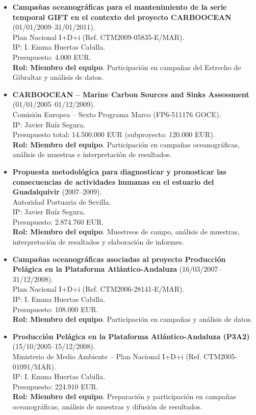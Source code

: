 \documentclass[11pt,a4paper]{article}
\begin{document}
\begin{itemize}[leftmargin=*]
    \item \textbf{Campañas oceanográficas para el mantenimiento de la serie temporal GIFT en el contexto del proyecto CARBOOCEAN} (01/01/2009--31/01/2011).\\
    Plan Nacional I+D+i (Ref. CTM2009-05835-E/MAR).\\
    IP: I. Emma Huertas Cabilla.\\
    Presupuesto: 4.000 EUR.\\
    \textbf{Rol: Miembro del equipo}. Participación en campañas del Estrecho de Gibraltar y análisis de datos.

    \item \textbf{CARBOOCEAN – Marine Carbon Sources and Sinks Assessment} (01/01/2005--01/12/2009).\\
    Comisión Europea – Sexto Programa Marco (FP6-511176 GOCE).\\
    IP: Javier Ruíz Segura.\\
    Presupuesto total: 14.500.000 EUR (subproyecto: 120.000 EUR).\\
    \textbf{Rol: Miembro del equipo}. Participación en campañas oceanográficas, análisis de muestras e interpretación de resultados.

    \item \textbf{Propuesta metodológica para diagnosticar y pronosticar las consecuencias de actividades humanas en el estuario del Guadalquivir} (2007--2009).\\
    Autoridad Portuaria de Sevilla.\\
    IP: Javier Ruíz Segura.\\
    Presupuesto: 2.874.760 EUR.\\
    \textbf{Rol: Miembro del equipo}. Muestreos de campo, análisis de muestras, interpretación de resultados y elaboración de informes.

    \item \textbf{Campañas oceanográficas asociadas al proyecto Producción Pelágica en la Plataforma Atlántico-Andaluza} (16/03/2007--31/12/2008).\\
    Plan Nacional I+D+i (Ref. CTM2006-28141-E/MAR).\\
    IP: I. Emma Huertas Cabilla.\\
    Presupuesto: 108.000 EUR.\\
    \textbf{Rol: Miembro del equipo}. Participación en campañas y análisis de datos.

    \item \textbf{Producción Pelágica en la Plataforma Atlántico-Andaluza (P3A2)} (15/10/2005--15/12/2008).\\
    Ministerio de Medio Ambiente – Plan Nacional I+D+i (Ref. CTM2005-01091/MAR).\\
    IP: I. Emma Huertas Cabilla.\\
    Presupuesto: 224.910 EUR.\\
    \textbf{Rol: Miembro del equipo}. Preparación y participación en campañas oceanográficas, análisis de muestras y difusión de resultados.


\end{itemize}
\end{document}
